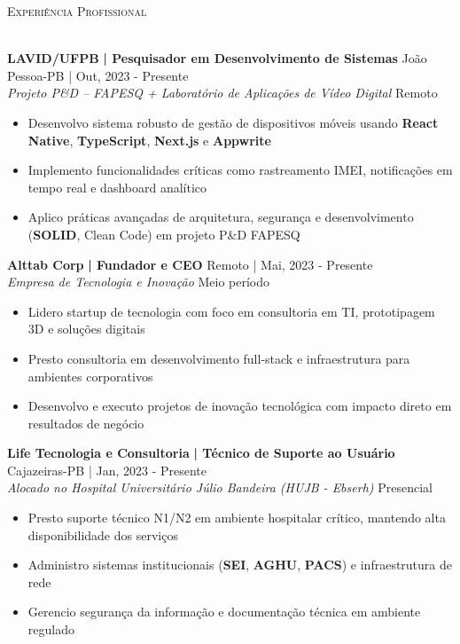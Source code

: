 \documentclass[a4paper]{article}
\newcommand{\lineunder}{
    \vspace*{-8pt} \\
    \hspace*{-18pt} \hrulefill \\
}
\newcommand{\header}[1]{
    {\hspace*{-18pt}\vspace*{6pt} \textsc{#1}}
    \vspace*{-6pt} \lineunder
}
\begin{document}
%
%
\header{Experiência Profissional}
\vspace{2mm}

\textbf{LAVID/UFPB}\textbf{ | Pesquisador em Desenvolvimento de Sistemas} \hfill João Pessoa-PB | Out, 2023 - Presente\\
\textit{Projeto P\&D – FAPESQ + Laboratório de Aplicações de Vídeo Digital} \hfill Remoto\\
\vspace{-3mm}
\begin{itemize} \itemsep -3pt
    \item Desenvolvo sistema robusto de gestão de dispositivos móveis usando \textbf{React Native}, \textbf{TypeScript}, \textbf{Next.js} e \textbf{Appwrite}
    \item Implemento funcionalidades críticas como rastreamento IMEI, notificações em tempo real e dashboard analítico
    \item Aplico práticas avançadas de arquitetura, segurança e desenvolvimento (\textbf{SOLID}, Clean Code) em projeto P\&D FAPESQ
\end{itemize}

\textbf{Alttab Corp}\textbf{ | Fundador e CEO} \hfill Remoto | Mai, 2023 - Presente\\
\textit{Empresa de Tecnologia e Inovação} \hfill Meio período\\
\vspace{-3mm}
\begin{itemize} \itemsep -3pt
    \item Lidero startup de tecnologia com foco em consultoria em TI, prototipagem 3D e soluções digitais
    \item Presto consultoria em desenvolvimento full-stack e infraestrutura para ambientes corporativos
    \item Desenvolvo e executo projetos de inovação tecnológica com impacto direto em resultados de negócio
\end{itemize}

\textbf{Life Tecnologia e Consultoria}\textbf{ | Técnico de Suporte ao Usuário} \hfill Cajazeiras-PB | Jan, 2023 - Presente\\
\textit{Alocado no Hospital Universitário Júlio Bandeira (HUJB - Ebserh)} \hfill Presencial\\
\vspace{-3mm}
\begin{itemize} \itemsep -3pt
    \item Presto suporte técnico N1/N2 em ambiente hospitalar crítico, mantendo alta disponibilidade dos serviços
    \item Administro sistemas institucionais (\textbf{SEI}, \textbf{AGHU}, \textbf{PACS}) e infraestrutura de rede
    \item Gerencio segurança da informação e documentação técnica em ambiente regulado
\end{itemize}
\end{document}
